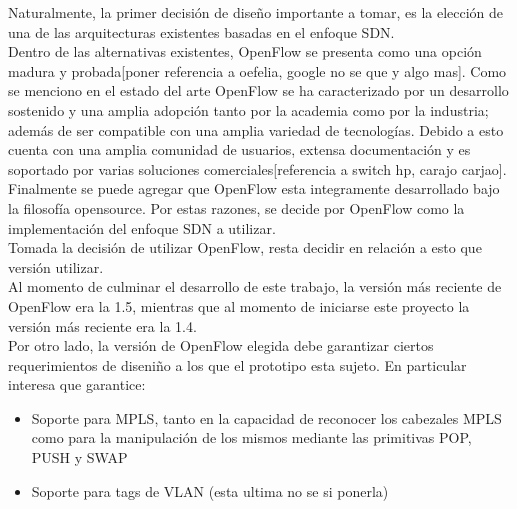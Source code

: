 Naturalmente, la primer decisi\'on de dise\~no importante a tomar, es la elecci\'on de una de las arquitecturas existentes basadas en el enfoque SDN.\\
  
Dentro de las alternativas existentes, OpenFlow se presenta como una opci\'on madura y probada[poner referencia a oefelia, google no se que y algo mas]. Como se menciono en el estado del arte OpenFlow  se ha caracterizado por un desarrollo sostenido y una amplia adopci\'on tanto por la academia como por la industria; adem\'as de ser compatible con una amplia variedad de tecnolog\'ias. Debido a esto cuenta con una amplia comunidad de usuarios, extensa documentaci\'on y es soportado por varias soluciones comerciales[referencia a switch hp, carajo carjao]. Finalmente se puede agregar que OpenFlow esta integramente desarrollado bajo la filosof\'ia opensource. Por estas razones, se decide por OpenFlow como la implementaci\'on del enfoque SDN a utilizar.\\






Tomada la decisi\'on de utilizar OpenFlow, resta decidir en relaci\'on a esto que versi\'on utilizar.\\
Al momento de culminar el desarrollo de este trabajo, la versi\'on m\'as reciente de OpenFlow era la 1.5, mientras que al momento de iniciarse este proyecto la versi\'on m\'as reciente era la 1.4.\\

Por otro lado, la versi\'on de OpenFlow elegida debe garantizar ciertos requerimientos de diseni\~no a los que el prototipo esta sujeto. En particular interesa que garantice:

\begin{itemize}
\item Soporte para MPLS, tanto en la capacidad de reconocer los cabezales MPLS como para la manipulaci\'on de los mismos mediante las primitivas POP, PUSH y SWAP
\item Soporte para tags de VLAN (esta ultima no se si ponerla)
\end{itemize}

